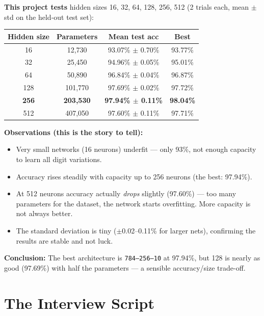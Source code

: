 \documentclass[12pt, a4paper]{article}
\begin{document}
\textbf{This project tests} hidden sizes 16, 32, 64, 128, 256, 512 (2 trials each, mean $\pm$ std on the held-out test set):

\begin{center}
\begin{tabular}{cccc}
  \toprule
  Hidden size & Parameters & Mean test acc & Best \\
  \midrule
  16  & 12,730  & 93.07\% $\pm$ 0.70\% & 93.77\% \\
  32  & 25,450  & 94.96\% $\pm$ 0.05\% & 95.01\% \\
  64  & 50,890  & 96.84\% $\pm$ 0.04\% & 96.87\% \\
  128 & 101,770 & 97.69\% $\pm$ 0.02\% & 97.72\% \\
  \textbf{256} & \textbf{203,530} & \textbf{97.94\% $\pm$ 0.11\%} & \textbf{98.04\%} \\
  512 & 407,050 & 97.60\% $\pm$ 0.11\% & 97.71\% \\
  \bottomrule
\end{tabular}
\end{center}

\textbf{Observations (this is the story to tell):}
\begin{itemize}
  \item Very small networks (16 neurons) underfit --- only 93\%, not enough capacity to learn all digit variations.
  \item Accuracy rises steadily with capacity up to 256 neurons (the best: 97.94\%).
  \item At 512 neurons accuracy actually \textit{drops} slightly (97.60\%) --- too many parameters for the dataset, the network starts overfitting. More capacity is not always better.
  \item The standard deviation is tiny ($\pm$0.02--0.11\% for larger nets), confirming the results are stable and not luck.
\end{itemize}

\textbf{Conclusion:} The best architecture is \texttt{784--256--10} at 97.94\%, but 128 is nearly as good (97.69\%) with half the parameters --- a sensible accuracy/size trade-off.

\section{The Interview Script}
\end{document}
